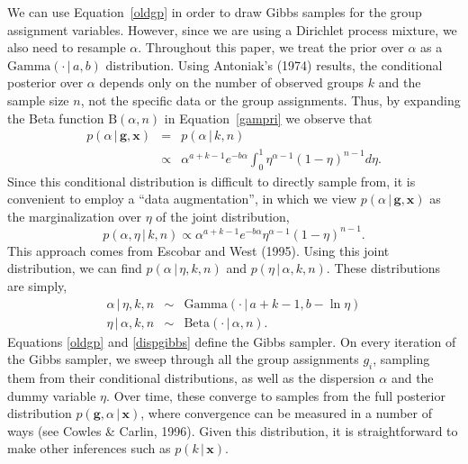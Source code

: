 \documentclass[authoryear]{elsarticle}
\newcommand{\condon}{\,|\,}
\newcommand{\vctr}[1]{\bm{#1}}
\begin{document}
We can use Equation~\ref{oldgp} in order to draw Gibbs samples for the
group assignment variables. However, since we are using a Dirichlet process
mixture, we also need to resample $\alpha$. Throughout
this paper, we treat the prior over $\alpha$ as a
$\mbox{Gamma}(\cdot \condon a,b)$ distribution.
Using Antoniak's (1974) results, the conditional posterior over $\alpha$ depends
only on the number of observed groups $k$ and the sample size $n$, not the
specific data or the group assignments. Thus,
by expanding the Beta function $\mathrm{B}(\alpha,n)$ in Equation~\ref{gampri}
we observe that
\begin{eqnarray*}
        p(\alpha\condon \vctr{g}, \vctr{x}) &=& p(\alpha\condon k, n) \\
        &\propto& \alpha^{a+k-1} e^{-b\alpha} \int^1_0
        \eta^{\alpha-1}(1-\eta)^{n-1} d\eta.
\end{eqnarray*}
Since this conditional distribution is difficult to directly sample from, it is convenient
to employ a ``data augmentation'', in which we view  $p(\alpha\condon \vctr{g},
\vctr{x}) $ as the marginalization over $\eta$ of the joint distribution,
\[
p(\alpha,\eta \condon k, n) \propto \alpha^{a+k-1}
e^{-b\alpha} \eta^{\alpha-1}(1-\eta)^{n-1}.
\]
\noindent This approach comes from Escobar and West (1995).
Using this joint distribution, we can find $p(\alpha
\condon\eta,k, n)$ and $p(\eta \condon \alpha,k, n)$. These distributions
are simply,
\begin{equation}\label{dispgibbs}
\begin{array}{rcl}
\alpha \condon \eta,k, n &\sim& \mbox{Gamma}(\cdot \condon a+k-1,b-\ln \eta) \\
\eta \condon \alpha, k, n &\sim& \mbox{Beta}(\cdot \condon \alpha,n).
\end{array}
\end{equation}
Equations \ref{oldgp} and \ref{dispgibbs} define the Gibbs sampler. On every
iteration of the Gibbs sampler, we sweep through all the group assignments $g_i$,
sampling them from their conditional distributions, as well as the dispersion
$\alpha$ and the dummy variable $\eta$. Over time, these converge to samples
from the full posterior distribution $p(\vctr{g},\alpha \condon \vctr{x})$, where convergence
can be measured in a number of ways (see Cowles \& Carlin, 1996). Given this distribution,
it is straightforward to make other inferences such as $p(k \condon \vctr{x})$.
\end{document}
